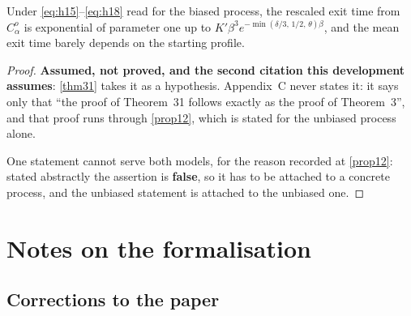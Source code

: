 \begin{proposition}
  \label{prop12-biased}
  \leanok
  Under \eqref{eq:h15}--\eqref{eq:h18} read for the biased process, the
  rescaled exit time from $C_\alpha^o$ is exponential of parameter one up to
  $K'\beta^3 e^{-\min(\delta/3,\,1/2,\,\theta)\beta}$, and the mean exit time
  barely depends on the starting profile.
\end{proposition}
\begin{proof}
  \textbf{Assumed, not proved, and the second citation this development
  assumes}: \ref{thm31} takes it as a hypothesis.  Appendix~C never states it:
  it says only that ``the proof of Theorem~31 follows exactly as the proof of
  Theorem~3'', and that proof runs through \ref{prop12}, which is stated for
  the unbiased process alone.

  One statement cannot serve both models, for the reason recorded at
  \ref{prop12}: stated abstractly the assertion is \textbf{false}, so it has
  to be attached to a concrete process, and the unbiased statement is attached
  to the unbiased one.
\end{proof}

\chapter{Notes on the formalisation}
\label{chap:notes}

\section{Corrections to the paper}
\label{sec:corrections}

